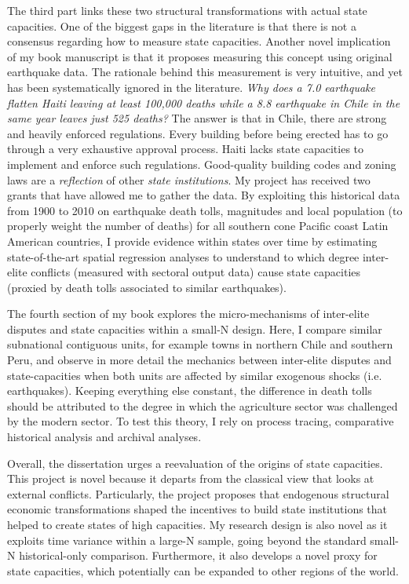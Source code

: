 \documentclass[11pt]{letter} %
\begin{document}
\begin{letter}{}
The third part links these two structural transformations with actual state capacities. One of the biggest gaps in the literature is that there is not a consensus regarding how to measure state capacities. Another novel implication of my book manuscript is that it proposes measuring this concept using original earthquake data. The rationale behind this measurement is very intuitive, and yet has been systematically ignored in the literature. \emph{Why does a 7.0 earthquake flatten Haiti leaving at least 100,000 deaths while a 8.8 earthquake in Chile in the same year leaves just 525 deaths?} The answer is that in Chile, there are strong and heavily enforced regulations. Every building before being erected has to go through a very exhaustive approval process. Haiti lacks state capacities to implement and enforce such regulations. Good-quality building codes and zoning laws are a \emph{reflection} of other \emph{state institutions}. My project has received two grants that have allowed me to gather the data. By exploiting this historical data from 1900 to 2010 on earthquake death tolls, magnitudes and local population (to properly weight the number of deaths) for all southern cone Pacific coast Latin American countries, I provide evidence within states over time by estimating state-of-the-art spatial regression analyses to understand to which degree inter-elite conflicts (measured with sectoral output data) cause state capacities (proxied by death tolls associated to similar earthquakes). 

The fourth section of my book explores the micro-mechanisms of inter-elite disputes and state capacities within a small-N design. Here, I compare similar subnational contiguous units, for example towns in northern Chile and southern Peru, and observe in more detail the mechanics between inter-elite disputes and state-capacities when both units are affected by similar exogenous shocks (i.e. earthquakes). Keeping everything else constant, the difference in death tolls should be attributed to the degree in which the agriculture sector was challenged by the modern sector. To test this theory, I rely on process tracing, comparative historical analysis and archival analyses. 

Overall, the dissertation urges a reevaluation of the origins of state capacities. This project is novel because it departs from the classical view that looks at external conflicts. Particularly, the project proposes that endogenous structural economic transformations shaped the incentives to build state institutions that helped to create states of high capacities. My research design is also novel as it exploits time variance within a large-N sample, going beyond the standard small-N historical-only comparison. Furthermore, it also develops a novel proxy for state capacities, which potentially can be expanded to other regions of the world.



\end{letter}
\end{document}
